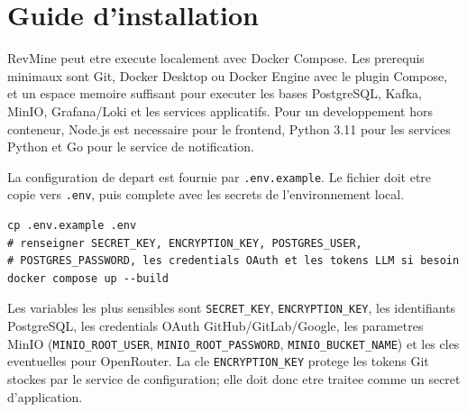 
\section{Guide d'installation}

RevMine peut etre execute localement avec Docker Compose. Les prerequis minimaux sont Git,
Docker Desktop ou Docker Engine avec le plugin Compose, et un espace memoire suffisant pour
executer les bases PostgreSQL, Kafka, MinIO, Grafana/Loki et les services applicatifs. Pour un
developpement hors conteneur, Node.js est necessaire pour le frontend, Python 3.11 pour les
services Python et Go pour le service de notification.

La configuration de depart est fournie par \texttt{.env.example}. Le fichier doit etre copie
vers \texttt{.env}, puis complete avec les secrets de l'environnement local.

\begin{lstlisting}[caption={Initialisation de l'environnement local RevMine},label={lst:annexe-install-env},breaklines=true]
cp .env.example .env
# renseigner SECRET_KEY, ENCRYPTION_KEY, POSTGRES_USER,
# POSTGRES_PASSWORD, les credentials OAuth et les tokens LLM si besoin
docker compose up --build
\end{lstlisting}

Les variables les plus sensibles sont \texttt{SECRET\_KEY}, \texttt{ENCRYPTION\_KEY}, les
identifiants PostgreSQL, les credentials OAuth GitHub/GitLab/Google, les parametres MinIO
(\texttt{MINIO\_ROOT\_USER}, \texttt{MINIO\_ROOT\_PASSWORD}, \texttt{MINIO\_BUCKET\_NAME}) et les
cles eventuelles pour OpenRouter. La cle \texttt{ENCRYPTION\_KEY} protege les tokens Git stockes
par le service de configuration; elle doit donc etre traitee comme un secret d'application.

